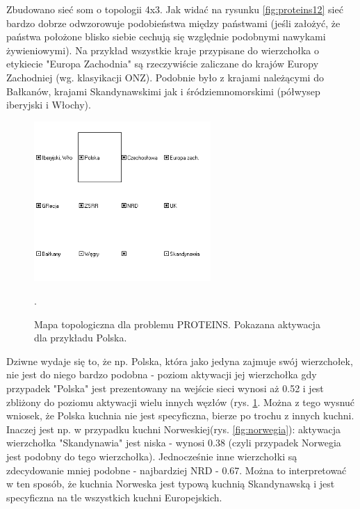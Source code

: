 Zbudowano sieć som o topologii 4x3. Jak widać na rysunku \ref{fig:proteins12} sieć bardzo dobrze odwzorowuje podobieństwa między państwami (jeśli założyć, że państwa położone blisko siebie cechują się względnie podobnymi nawykami żywieniowymi). Na przykład wszystkie kraje przypisane do wierzchołka o etykiecie "Europa Zachodnia" są rzeczywiście zaliczane do krajów Europy Zachodniej (wg. klasyikacji ONZ). Podobnie było z krajami należącymi do Bałkanów, krajami Skandynawskimi jak i śródziemnomorskimi (półwysep iberyjski i Włochy).

\begin{figure}[h]
\begin{centering}
\includegraphics[width=0.6\textwidth]{dane/part3/zad2/polska}
\caption{Mapa topologiczna dla problemu PROTEINS. Pokazana aktywacja dla przykładu Polska.\label{fig:polska}}.
\end{centering}
\end{figure}

Dziwne wydaje się to, że np. Polska, która jako jedyna zajmuje swój wierzchołek, nie jest do niego bardzo podobna - poziom aktywacji jej wierzchołka gdy przypadek "Polska" jest prezentowany na wejście sieci wynosi aż 0.52 i jest zbliżony do poziomu aktywacji wielu innych węzłów (rys. \ref{fig:polska}. Można z tego wysnuć wniosek, że Polska kuchnia nie jest specyficzna, bierze po trochu z innych kuchni.
Inaczej jest np. w przypadku kuchni Norweskiej(rys. \ref{fig:norwegia}):  aktywacja wierzchołka "Skandynawia" jest niska - wynosi 0.38 (czyli przypadek Norwegia jest podobny do tego wierzchołka). Jednocześnie inne wierzchołki są zdecydowanie mniej podobne - najbardziej NRD - 0.67. Można to interpretować w ten sposób, że kuchnia Norweska jest typową kuchnią Skandynawską i jest specyficzna na tle wszystkich kuchni Europejskich.


